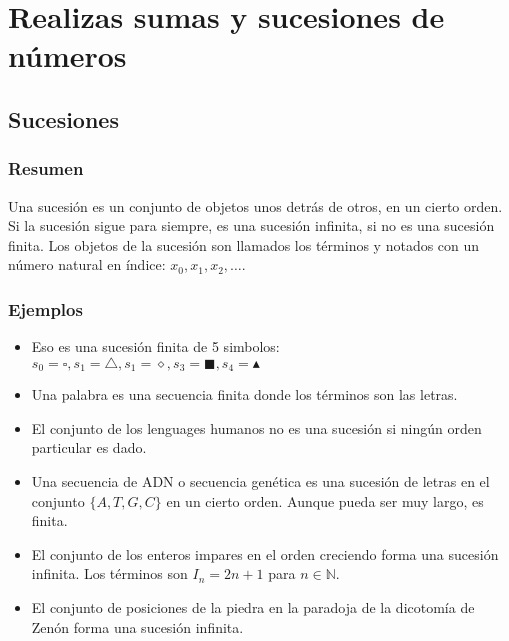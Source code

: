 \chapter{Realizas sumas y sucesiones de números}

\section{Sucesiones}

\subsection*{Resumen}

Una sucesión es un conjunto de objetos unos detrás de otros, en un cierto orden.
Si la sucesión sigue para siempre, es una sucesión infinita, si no es una
sucesión finita. Los objetos de la sucesión son llamados los términos y
notados con un número natural en índice: $x_0, x_1, x_2, \ldots$.

\subsection*{Ejemplos}

\begin{itemize}
\item Eso es una sucesión finita de 5 simbolos:
  $s_0 = \square, s_1 = \triangle, s_1 = \diamond, s_3 = \blacksquare,
  s_4 = \blacktriangle$
\item Una palabra es una secuencia finita donde los términos son las letras.
\item El conjunto de los lenguages humanos no es una sucesión si ningún orden 
  particular es dado.
\item Una secuencia de ADN o secuencia genética es una sucesión de letras en
  el conjunto  $\{ A, T, G, C \}$ en un cierto orden.
  Aunque pueda ser muy largo, es finita.
\item El conjunto de los enteros impares en el orden creciendo
  forma una sucesión
  infinita. Los términos son $I_n = 2n + 1$ para $n \in \mathbb N$.
\item El conjunto de posiciones de la piedra en la paradoja de la dicotomía de
  Zenón forma una sucesión infinita.
\begin{center}
\end{center}
\end{itemize}

